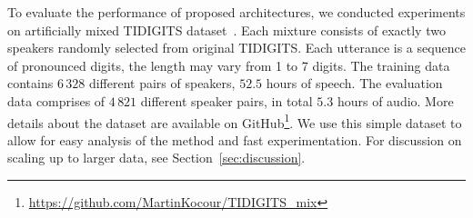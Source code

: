 \documentclass[a4paper]{article}
\begin{document}
To evaluate the performance of proposed architectures, we conducted experiments on artificially mixed TIDIGITS dataset~\cite{leonard1984}. Each mixture consists of exactly two speakers randomly selected from original TIDIGITS. Each utterance is a sequence of pronounced digits, the length may vary from 1 to 7 digits. The training data contains $6\,328$ different pairs of speakers, $52.5$ hours of speech. The evaluation data comprises of $4\,821$ different speaker pairs, in total $5.3$ hours of audio.
More details about the dataset are available on GitHub\footnote{\url{https://github.com/MartinKocour/TIDIGITS_mix}}.
We use this simple dataset to allow for easy analysis of the method and fast experimentation. For discussion on scaling up to larger data, see Section~\ref{sec:discussion}.


\end{document}
